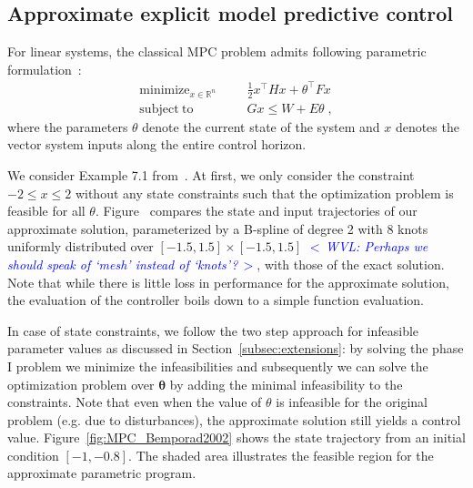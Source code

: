 \documentclass{article}
\DeclareMathOperator*{\minimize}{minimize}
\DeclareMathOperator*{\subj}{subject\;to}
\newcommand{\commentWVL}[1]{\noindent \textcolor{blue}{\emph{$<\,$WVL: #1$\,>$}}}%
\newcommand{\R}{\mathbb{R}}         %
\renewcommand{\t}{\intercal}        %
\newcommand{\ppar}{\theta}                          %
\newcommand{\Ppar}{{\bm{\theta}}}                   %
\begin{document}
\subsection{Approximate explicit model predictive control}
For linear systems, the classical MPC problem admits following parametric
formulation~\cite{Bemporad_et_al_2002}:
\[
\begin{aligned}
\minimize_{x \in \R^n} &&& \frac{1}{2} x^\t H x + \ppar^\t F x \\
\subj              &&& Gx \leq W + E\ppar \; ,
\end{aligned}
\]
where the parameters $\ppar$ denote the current state of the system and $x$
denotes the vector system inputs along the entire control horizon.

We consider Example 7.1 from~\cite{Bemporad_et_al_2002}. At first, we only
consider the constraint $-2 \leq x \leq 2$ without any state constraints such
that the optimization problem is feasible for all $\ppar$. Figure~ compares
the state and input trajectories of our approximate solution, parameterized by
a B-spline of degree 2 with 8 knots uniformly distributed over $[-1.5,
1.5]\times[-1.5, 1.5]$ \commentWVL{Perhaps we should speak of `mesh' instead
of `knots'?}, with those of the exact solution. Note that while there is
little loss in performance for the approximate solution, the evaluation of the
controller boils down to a simple function evaluation.

In case of state constraints, we follow the two step approach for infeasible
parameter values as discussed in Section~\ref{subsec:extensions}: by solving
the phase I problem we minimize the infeasibilities and subsequently we can
solve the optimization problem over $\Ppar$ by adding the minimal
infeasibility to the constraints. Note that even when the value of $\ppar$ is
infeasible for the original problem (e.g. due to disturbances), the
approximate solution still yields a control value.
Figure~\ref{fig:MPC_Bemporad2002} shows the state trajectory from an initial
condition $[-1, -0.8]$. The shaded area illustrates the feasible region for
the approximate parametric program.
\end{document}
